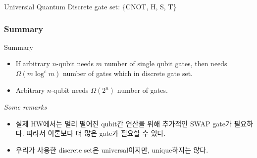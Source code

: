 \documentclass[9pt]{beamer}
\begin{document}
\begin{section}{Universial Quantum Discrete gate set: \{CNOT, H, S, T\}}
\begin{frame}
        \end{frame}

        \begin{frame}
            \frametitle{Summary}
            \begin{block}{Summary}
                \begin{itemize}
                    \item If arbitrary $n$-qubit needs $m$ number of single qubit gates, then needs $\Omega(m \log^c m)$ number of gates which in discrete gate set.
                    \item Arbitrary $n$-qubit needs $\Omega(2^n)$ number of gates.
                \end{itemize}
            \end{block}
            \vspace{0.2cm}
            \textit{Some remarks}
            \begin{itemize}
                \item 실제 HW에서는 멀리 떨어진 qubit간 연산을 위해 추가적인 SWAP gate가 필요하다. 따라서 이론보다 더 많은 gate가 필요할 수 있다.
                \item 우리가 사용한 discrete set은 universal이지만, unique하지는 않다.
            \end{itemize}
        
        \end{frame}
    \end{section}
    
\end{document}
